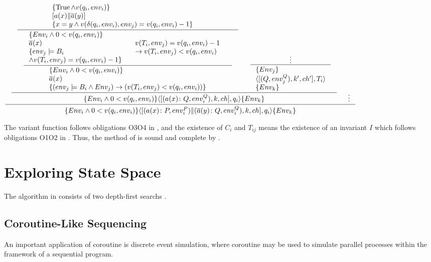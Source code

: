 \documentclass[12pt,a4paper,titlepage]{article}
\theoremstyle{break}
\begin{document}
  \begin{center}
    \begin{math}
\inference{
  \inference{
    \inference{\parbox{76mm}{\(\{\Truerm\wedge v(q_i,env_i)\}\)\\\([a(x)\|\bijection{a}(y)]\)\\
                             \(\{x=y\wedge v(\delta(q_i,env_i),env_j)=v(q_i,env_i)-1\}\)}}
    {\inference{\parbox{48mm}{\(\{Env_i\wedge 0<v(q_i,env_i)\}\)\\
                             \(\bijection{a}(x)\)\\
                             \(\{env_j\models B_i\)\\\(\wedge v(T_i,env_j)=v(q_i,env_i)-1\}\)}&
                  \parbox{46mm}{\(v(T_i,env_j)=v(q_i,env_i)-1\)\\\(->v(T_i,env_j)<v(q_i,env_i)\)}}
               {\parbox{79mm}{\(\{Env_i\wedge 0<v(q_i,env_i)\}\)\\
                              \(\bijection{a}(x)\)\\
                              \(\{(env_j\models B_i\wedge Env_j)->(v(T_i,env_j)<v(q_i,env_i))\}\)}}}&
     \inference{\vdots}
     {\parbox{35mm}{\(\{Env_j\}\)\\
                   \(\langle[(Q,env_j^Q),k',ch'],T_i\rangle\)\\
                   \(\{Env_k\}\)}}}
  {\{Env_i\wedge 0<v(q_i,env_i)\}\langle[(a(x)\colon Q,env_i^Q),k,ch],q_i\rangle\{Env_k\}}&\vdots}
{\{Env_i\wedge 0<v(q_i,env_i)\}\langle[(a(x)\colon P,env_i^P)\|(\bijection{a}(y)\colon Q,env_i^Q),k,ch],q_i\rangle\{Env_k\}}
    \end{math}
  \end{center}

The variant function follows obligations O3\textendash O4 in \cite{Alpern:1989}, and
the existence of \(C_{i}\) and \(T_{ij}\) means the existence of an invariant $I$ which follows obligations O1\textendash O2 in \cite{Alpern:1989}.
Thus, the method of \NHK is sound and complete by \cite{Alpern:1989}.
%
%
\section{Exploring State Space}
The algorithm in \NHK consists of two depth-first searchs \cite{Courcoubetis:1991}.
\subsection{Coroutine-Like Sequencing}
An important application of coroutine is discrete event simulation, where coroutine may be used to simulate parallel processes within the framework of a sequential program.
%
%


\end{document}
